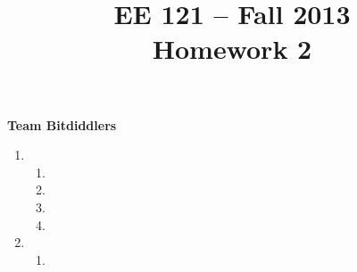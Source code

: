 \documentclass[11pt]{article}
\title{EE 121 -- Fall 2013\\Homework 2}
\begin{document}
\maketitle
\noindent\textbf{Team Bitdiddlers} \\

\begin{enumerate}


  \item
    \begin{enumerate}


        \item



        \item



        \item





        \item




    \end{enumerate}
    \newpage




  \item
    \begin{enumerate}

        \item
            


\end{enumerate}
\end{enumerate}
\end{document}
